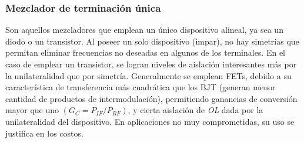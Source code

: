 \documentclass[twocolumn]{article}
\begin{document}
\subsubsection{Mezclador de terminación única}
Son aquellos mezcladores que emplean un único dispositivo alineal, ya sea un diodo o un transistor. Al poseer un solo dispositivo (impar), no hay simetrías que permitan eliminar frecuencias no deseadas en algunos de los terminales. En el caso de emplear un transistor, se logran niveles de aislación interesantes más por la unilateralidad que por simetría. Generalmente se emplean FETs, debido a su característica de transferencia más cuadrática que los BJT (generan menor cantidad de productos de intermodulación), permitiendo ganancias de conversión mayor que uno $(G_C = P_{IF}/P_{RF})$, y cierta aislación de \textit{OL} dada por la unilateralidad del dispositivo. En aplicaciones no muy comprometidas, su uso se justifica en los costos.
\end{document}
